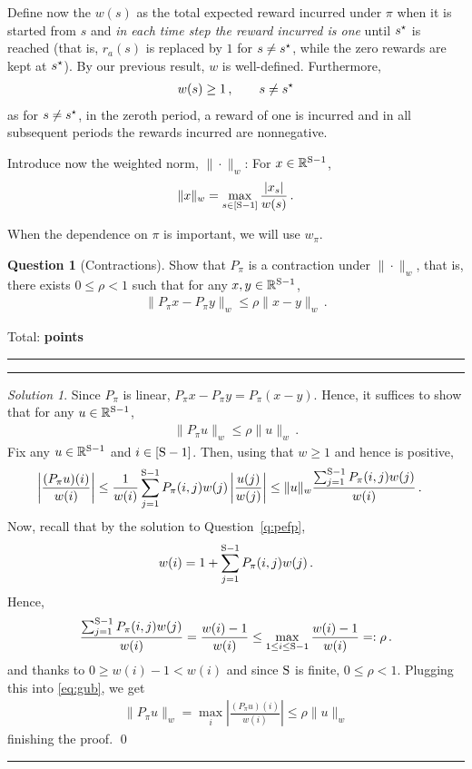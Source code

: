 \documentclass{article}
\newcommand{\norm}[1]{\| #1 \|}
\newcommand{\R}{\mathbb{R}}
\DeclareMathOperator*{\1}{\mathbbm{1}}
\newcounter{DocPoints} %
\newcounter{QuestionPoints} %
\newcommand{\tpoints}[1]{        %
	\ifthenelse{\isempty{#1}}%
	{%
	}%
	{%
		\addtocounter{DocPoints}{#1}
		\addtocounter{QuestionPoints}{#1}
	}													 %
	\par\mbox{}\par\noindent\hfill {Total: \bf \arabic{QuestionPoints}\xspace points}\par\mbox{}\par\hrule\hrule
	\setcounter{QuestionPoints}{0}
}
\theoremstyle{definition}
\newtheorem{question}{Question}
\theoremstyle{remark}
\newtheorem*{solution*}{Solution}
\begin{document}
Define now the $w(s)$ as the total expected reward incurred under $\pi$ when it is started from $s$ and \emph{in each time step the reward incurred is one} until $s^{\star}$ is reached (that is, $r_a(s)$ is replaced by $1$ for $s\ne s^{\star}$, while the zero rewards are kept at $s^{\star}$).
By our previous result, $w$ is well-defined.
Furthermore,
\begin{align*}
w(s)\ge 1\,, \qquad s\ne s^{\star}
\end{align*}
as for $s\ne s^{\star}$, in the zeroth period, a reward of one is incurred and in all subsequent periods the rewards incurred are nonnegative.

Introduce now the weighted norm, $\norm{\cdot}_w$: For $x\in \R^{\nS-1}$,
\begin{align*}
\norm{x}_w = \max_{s\in [\nS-1]} \frac{|x_s|}{w(s)}\,.
\end{align*}

When the dependence on $\pi$ is important, we will use $w_\pi$.

\begin{question}[Contractions]
\label{q:contr}
Show that $P_\pi$ is a contraction under $\norm{\cdot}_w$, that is,
there exists $0\le \rho <1$ such that
for any $x,y\in \R^{\nS-1}$,
\begin{align*}
\norm{P_\pi x- P_\pi y}_w \le \rho \norm{x-y}_w\,.
\end{align*}
\tpoints{15}
\end{question}
\begin{solution*}
Since $P_\pi$ is linear,
$P_\pi x- P_\pi y= P_\pi(x-y)$.
Hence, it suffices to show that for any $u\in \R^{\nS-1}$,
\begin{align*}
\norm{P_\pi u}_w \le \rho \norm{u}_w\,.
\end{align*}
Fix any $u\in \R^{\nS-1}$ and $i\in [\mathrm{S}-1]$.
Then, using that $w\ge 1$ and hence is positive,
\begin{align}
\left\vert \frac{(P_\pi u)(i)}{w(i)} \right\vert
& \le
\frac{1}{w(i)}
 \sum_{j=1}^{\nS-1} P_\pi(i,j) w(j) \left\vert \frac{u(j)}{w(j)}\right\vert
 \le
\norm{u}_w \frac{\sum_{j=1}^{\nS-1} P_\pi(i,j) w(j) }{w(i)} \,.
\label{eq:gub}
\end{align}
Now, recall that by the solution to Question~\ref{q:pefp},
\begin{align*}
w(i)=1+\sum_{j=1}^{\mathrm{S}-1} P_\pi(i,j) w(j)\,.
\end{align*}
Hence,
\begin{align*}
\frac{\sum_{j=1}^{\mathrm{S}-1} P_\pi(i,j) w(j) }{w(i)} 
=
\frac{w(i)-1 }{w(i)} 
\le
\max_{1\le i \le \mathrm{S}-1} \frac{w(i)-1 }{w(i)} =:\rho\,.
\end{align*}
and thanks to $0\ge w(i)-1 <w(i)$ and since $\mathrm{S}$ is finite, $0\le \rho <1$.
Plugging this into \eqref{eq:gub}, we get 
\begin{align*}
\norm{P_\pi u}_w = \max_i \left\vert \frac{(P_\pi u)(i)}{w(i)} \right\vert
 \le
\rho \norm{u}_w 
\end{align*}
finishing the proof.
\qed\par\smallskip\hrule
\end{solution*}
\end{document}
